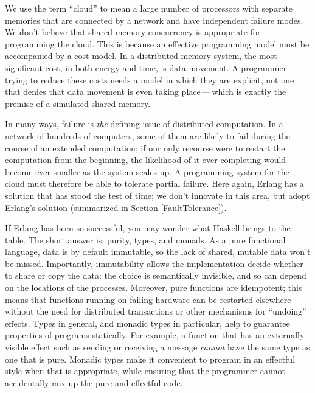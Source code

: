 \documentclass[preprint]{sigplanconf}
\begin{document}
We use the term ``cloud'' to mean a large number of processors with separate memories that are connected by a network and have independent failure modes.
We don't believe that shared-memory concurrency is appropriate for programming the cloud.
This is because an effective programming model must be accompanied by a cost model.
In a distributed memory system, the most significant cost, in both energy and time, is data movement.
A programmer trying to reduce these costs needs a model in which they are explicit, not one that denies that data movement is even taking place\,---\,which is exactly the premise of a simulated shared memory. 

In many ways, failure is \emph{the} defining issue of distributed computation.  
In a network of hundreds of computers, some of them are likely to fail during the course of an extended computation; if our only recourse were to restart the computation from the beginning, the likelihood of it ever completing would become ever smaller as the system scales up.  
A programming system for the cloud must therefore be able to tolerate partial failure.  Here again, Erlang has a solution that has stood the test of time; 
we don't innovate in this area, but adopt Erlang's solution (summarized in Section \ref{FaultTolerance}).

If Erlang has been so successful, you may wonder what Haskell brings to the table. 
The short answer is: purity, types, and monads. 
As a pure functional language, data is by default immutable, so the lack of shared, mutable data won't be missed. 
Importantly, immutability allows the implementation decide whether to share or copy the data: the choice is semantically invisible, and so can depend on the locations of the processes. 
Moreover, pure functions are idempotent; this means that functions running on failing hardware can be restarted elsewhere without the need for distributed transactions or other mechanisms for ``undoing'' effects.  
Types in general, and monadic types in particular, help to guarantee properties of programs statically.  
For example, a function that has an externally-visible effect such as sending or receiving a message \emph{cannot} have the same type as one that is pure.
Monadic types make it convenient to program in an effectful style when that is appropriate, while ensuring that the programmer cannot accidentally mix up the pure and effectful code.
\end{document}
